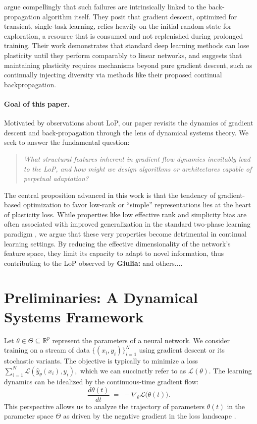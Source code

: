 \documentclass{article}
\newcommand{\Loss}{\mathcal{L}}
\newcommand{\R}{\mathbb{R}}
\newcommand{\giulia}[1]{{\color{ForestGreen}\textbf{Giulia:} #1}}
\begin{document}
\citet{dohare2024loss} argue compellingly that such failures are intrinsically linked to the back-propagation algorithm itself. They posit that gradient descent, optimized for transient, single-task learning, relies heavily on the initial random state for exploration, a resource that is consumed and not replenished during prolonged training. Their work demonstrates that standard deep learning methods can lose plasticity until they perform comparably to linear networks, and suggests that maintaining plasticity requires mechanisms beyond pure gradient descent, such as continually injecting diversity via methods like their proposed continual backpropagation.

\paragraph{Goal of this paper.}
Motivated by observations about LoP, our paper revisits the dynamics of gradient descent and back-propagation through the lens of dynamical systems theory. We seek to answer the fundamental question:
\begin{quote}
\emph{What structural features inherent in gradient flow dynamics inevitably lead to the LoP, and how might we design algorithms or architectures capable of perpetual adaptation?}
\end{quote}
The central proposition advanced in this work is that the tendency of gradient-based optimization to favor low-rank or ``simple'' representations lies at the heart of plasticity loss. While properties like low effective rank and simplicity bias are often associated with improved generalization in the standard two-phase learning paradigm \citep{huh2022lowrank, papyan2020prevalence, zhang2017understanding}, we argue that these very properties become detrimental in continual learning settings. By reducing the effective dimensionality of the network's feature space, they limit its capacity to adapt to novel information, thus contributing to the LoP observed by \citep{dohare2024loss} \giulia{and others...}.

\section{Preliminaries: A Dynamical Systems Framework}
\label{sec:framework}

Let $\theta\in\Theta\subseteq\R^p$ represent the parameters of a neural network. We consider training on a stream of data $\{(x_i,y_i)\}_{i=1}^N$ using gradient descent or its stochastic variants. The objective is typically to minimize a loss  $\sum_{i=1}^N \Loss(\hat{y}_\theta(x_i),y_i),$ which we can succinctly refer to as $\Loss(\theta)$. The learning dynamics can be idealized by the continuous-time gradient flow:
\begin{equation}
    \frac{d\theta(t)}{dt} \;=\; -\nabla_\theta\Loss\bigl(\theta(t)\bigr).
    \label{eq:grad_flow}
\end{equation}
This perspective allows us to analyze the trajectory of parameters $\theta(t)$ in the parameter space $\Theta$ as driven by the negative gradient in the loss landscape \citep{saxe2014exact}.
\end{document}
